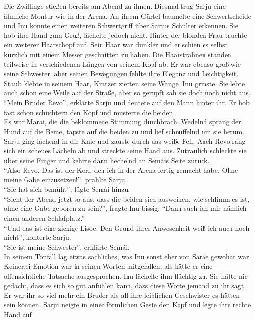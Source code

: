 Die Zwillinge stießen bereits am Abend zu ihnen. Diesmal trug Sarju eine ähnliche Montur wie in der 
Arena. An ihrem Gürtel baumelte eine Schwertscheide und Inu konnte einen weiteren Schwertgriff über 
Sarjus Schulter erkennen. Sie hob ihre Hand zum Gruß, lächelte jedoch nicht. Hinter der blonden 
Frau tauchte ein weiterer Haarschopf auf. Sein Haar war dunkler und er schien es selbst kürzlich 
mit einem Messer geschnitten zu haben. Die Haarsträhnen standen teilweise in verschiedenen Längen 
von seinem Kopf ab. Er war ebenso groß wie seine Schwester, aber seinen Bewegungen fehlte ihre 
Eleganz und Leichtigkeit. Staub klebte in seinem Haar, Kratzer zierten seine Wange. Inu grinste. 
Sie lebte auch schon eine Weile auf der Straße, aber so gerupft sah sie doch noch nicht aus. \\
``Mein Bruder Revo'', erklärte Sarju und deutete auf den Mann hinter ihr. Er hob fast schon 
schüchtern den Kopf und musterte die beiden.\\
Es war Marai, die die beklommene Stimmung durchbrach. Wedelnd sprang der Hund auf die Beine, tapste 
auf die beiden zu und lief schnüffelnd um sie herum. Sarju ging lachend in die Knie und zauste 
durch das weiße Fell. Auch Revo rang sich ein scheues Lächeln ab und streckte seine Hand aus. 
Zutraulich schleckte sie über seine Finger und kehrte dann hechelnd an Semáis Seite zurück. \\
``Also Revo. Das ist der Kerl, den ich in der Arena fertig gemacht habe. Ohne meine Gabe 
einzusetzen!'', prahlte Sarju.\\
``Sie hat sich bemüht'', fügte Semái hinzu.\\
``Sieht der Abend jetzt so aus, dass die beiden sich ausweinen, wie schlimm es ist, ohne eine Gabe 
geboren zu sein?'', fragte Inu bissig: ``Dann such ich mir nämlich einen anderen Schlafplatz.''\\
``Und das ist eine zickige Lisoe. Den Grund ihrer Anwesenheit weiß ich auch noch nicht'', konterte 
Sarju.\\
``Sie ist meine Schwester'', erklärte Semái.\\
In seinem Tonfall lag etwas sachliches, was Inu sonst eher von Saráe gewohnt war. Keinerlei Emotion 
war in seinen Worten mitgefallen, als hätte er eine offensichtliche Tatsache ausgesprochen. Inu 
lächelte ihm flüchtig zu. Sie hätte nie gedacht, dass es sich so gut anfühlen kann, dass diese 
Worte jemand zu ihr sagt. Er war ihr so viel mehr ein Bruder als all ihre leiblichen Geschwister es 
hätten sein können. Sarju neigte in einer förmlichen Geste den Kopf und legte ihre rechte Hand auf 
